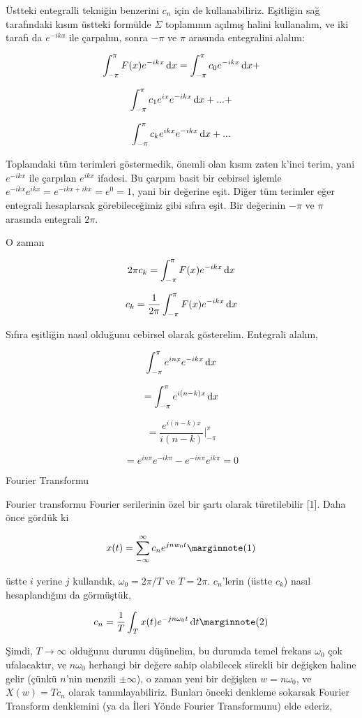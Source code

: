 \documentclass[12pt,fleqn]{article}\usepackage{../../common}
\begin{document}
Üstteki entegralli tekniğin benzerini $c_n$ için de
kullanabiliriz. Eşitliğin sağ tarafındaki kısım üstteki formülde
$\Sigma$ toplamının açılmış halini kullanalım, ve iki tarafı da
$e^{-ikx}$ ile çarpalım, sonra $-\pi$ ve $\pi$ arasında entegralini
alalım:

$$ \int_{-\pi}^{\pi}F(x)e^{-ikx}\,\mathrm{d} x = \int_{-\pi}^{\pi}c_0e^{-ikx}\,\mathrm{d} x + $$

$$ \int_{-\pi}^{\pi}c_1e^{ix}e^{-ikx}\,\mathrm{d} x + ... +  $$

$$ \int_{-\pi}^{\pi}c_ke^{ikx}e^{-ikx}\,\mathrm{d} x + ... $$

Toplamdaki tüm terimleri göstermedik, önemli olan kısım zaten k'inci terim, yani
$e^{-ikx}$ ile çarpılan $e^{ikx}$ ifadesi. Bu çarpım basit bir cebirsel işlemle
$e^{-ikx}e^{ikx} = e^{-ikx + ikx} = e^{0} = 1$, yani bir değerine eşit. Diğer
tüm terimler eğer entegrali hesaplarsak görebileceğimiz gibi sıfıra eşit. Bir
değerinin $-\pi$ ve $\pi$ arasında entegrali $2\pi$. 

O zaman

$$ 2\pi c_k = \int_{-\pi}^{\pi}F(x)e^{-ikx}\,\mathrm{d} x $$

$$ c_k = \frac{1}{2\pi}\int_{-\pi}^{\pi}F(x)e^{-ikx}\,\mathrm{d} x $$

Sıfıra eşitliğin nasıl olduğunu cebirsel olarak gösterelim. Entegrali alalım,

$$ \int_{-\pi}^{\pi}e^{inx}e^{-ikx}\,\mathrm{d} x $$

$$ = \int_{-\pi}^{\pi}e^{i(n-k)x}\,\mathrm{d} x $$

$$ = \frac{e^{i(n-k)x}}{i(n-k)} \bigg|_{-\pi}^{\pi}  $$

$$ = e^{in\pi}e^{-ik\pi} - e^{-in\pi}e^{ik\pi} = 0 $$

Fourier Transformu

Fourier transformu Fourier serilerinin özel bir şartı olarak türetilebilir
[1]. Daha önce gördük ki 

$$ 
x(t) = \sum_{-\infty}^{\infty} c_n e^{jnw_0t} 
\mlabel{1} 
$$

üstte $i$ yerine $j$ kullandık, $\omega_0 = 2\pi / T$ ve $T = 2\pi$. $c_n$'lerin
(üstte $c_k$) nasıl hesaplandığını da görmüştük,

$$ 
c_n = \frac{1}{T} \int_{T} x(t) e^{-jn\omega_0t} \ud t 
\mlabel{2} 
$$

Şimdi, $T \to \infty$ olduğunu durumu düşünelim, bu durumda temel frekans
$\omega_0$ çok ufalacaktır, ve $n\omega_0$ herhangi bir değere sahip
olabilecek sürekli bir değişken haline gelir (çünkü $n$'nin menzili
$\pm \infty$), o zaman yeni bir değişken $w = n\omega_0$, ve $X(w) = Tc_n$
olarak tanımlayabiliriz. Bunları önceki denkleme sokarsak Fourier Transform
denklemini (ya da İleri Yönde Fourier Transformunu) elde ederiz,
\end{document}
